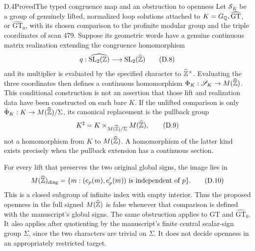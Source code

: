 \begin{statement}{D.4}{Proved}{The typed congruence map and an obstruction to openness}
Let \(\mathscr S_K\) be a group of genuinely lifted, normalized
loop solutions attached to
\(K=G_\mathbb Q,\widehat{\mathrm{GT}}\), or
\(\widehat{\mathrm{GT}}_0\), with its chosen comparison to the
profinite modular group and the triple coordinates of scan 479.
Suppose its geometric words have a genuine continuous matrix
realization extending the congruence homomorphism
\[
 q:\widehat{\operatorname{SL}_2(\mathbb Z)}\longrightarrow\operatorname{SL}_2(\widehat{\mathbb Z})
 \tag{D.8}
\]
and its multiplier is evaluated by the specified character
to \(\widehat{\mathbb Z}^{\times}\).
Evaluating the three coordinates then defines a continuous
homomorphism \(\Phi_K:\mathscr S_K\to M(\widehat{\mathbb Z})\).
This conditional construction is not an assertion that those
lift and realization data have been constructed on each bare \(K\).
If the unlifted comparison is only
\(\bar\Phi_K:K\to M(\widehat{\mathbb Z})/\Sigma\), its canonical
replacement is the pullback group
\[
 K^\sharp=K\times_{M(\widehat{\mathbb Z})/\Sigma}M(\widehat{\mathbb Z}),
 \tag{D.9}
\]
not a homomorphism from \(K\) to \(M(\widehat{\mathbb Z})\).
A homomorphism of the latter kind exists precisely when the
pullback extension has a continuous section.

For every lift that preserves the two original global signs,
the image lies in
\[
 M(\widehat{\mathbb Z})_{\mathrm{diag}}
 =\{m:(e_p(m),e'_p(m))\hbox{ is independent of }p\}.
 \tag{D.10}
\]
This is a closed subgroup of infinite index with empty interior.
Thus the proposed openness in the full signed
\(M(\widehat{\mathbb Z})\) is false whenever that comparison is defined
with the manuscript's global signs.  The same obstruction applies
to \(\widehat{\mathrm{GT}}\) and \(\widehat{\mathrm{GT}}_0\).
It also applies after quotienting by the manuscript's finite
central scalar-sign group \(\Sigma\), since the two characters
are trivial on \(\Sigma\).
It does not decide openness in an appropriately restricted target.
\end{statement}
